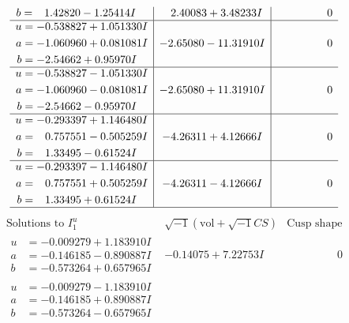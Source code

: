 \documentclass[1p]{elsarticle_modified}
\theoremstyle{definition}
\newcommand{\I}{\sqrt{-1}}
\begin{document}
$$\begin{array}{c|c|c}
\begin{aligned}
b &= \phantom{-}1.42820 - 1.25414 I\end{aligned}
 & \phantom{-}2.40083 + 3.48233 I & \phantom{-0.000000 } 0 \\ \hline\begin{aligned}
u &= -0.538827 + 1.051330 I \\
a &= -1.060960 + 0.081081 I \\
b &= -2.54662 + 0.95970 I\end{aligned}
 & -2.65080 - 11.31910 I & \phantom{-0.000000 } 0 \\ \hline\begin{aligned}
u &= -0.538827 - 1.051330 I \\
a &= -1.060960 - 0.081081 I \\
b &= -2.54662 - 0.95970 I\end{aligned}
 & -2.65080 + 11.31910 I & \phantom{-0.000000 } 0 \\ \hline\begin{aligned}
u &= -0.293397 + 1.146480 I \\
a &= \phantom{-}0.757551 - 0.505259 I \\
b &= \phantom{-}1.33495 - 0.61524 I\end{aligned}
 & -4.26311 + 4.12666 I & \phantom{-0.000000 } 0 \\ \hline\begin{aligned}
u &= -0.293397 - 1.146480 I \\
a &= \phantom{-}0.757551 + 0.505259 I \\
b &= \phantom{-}1.33495 + 0.61524 I\end{aligned}
 & -4.26311 - 4.12666 I & \phantom{-0.000000 } 0\\
 \hline 
 \end{array}$$\newpage$$\begin{array}{c|c|c}  
\text{Solutions to }I^u_{1}& \I (\text{vol} + \sqrt{-1}CS) & \text{Cusp shape}\\
 \hline 
\begin{aligned}
u &= -0.009279 + 1.183910 I \\
a &= -0.146185 - 0.890887 I \\
b &= -0.573264 + 0.657965 I\end{aligned}
 & -0.14075 + 7.22753 I & \phantom{-0.000000 } 0 \\ \hline\begin{aligned}
u &= -0.009279 - 1.183910 I \\
a &= -0.146185 + 0.890887 I \\
b &= -0.573264 - 0.657965 I\end{aligned}

\end{array}$$
\end{document}
